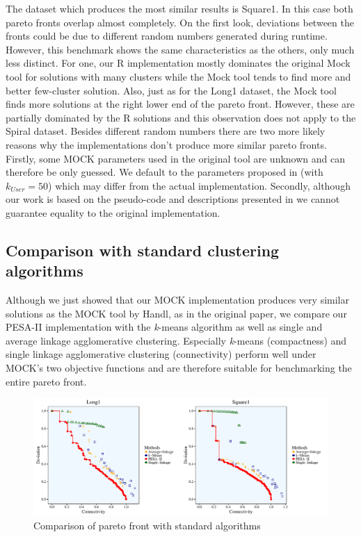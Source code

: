 \documentclass[parskip=half,DIV=14]{scrartcl}\usepackage[]{graphicx}\usepackage[]{color}
\begin{document}
The dataset which produces the most similar results is Square1. In this case both pareto fronts overlap almost completely. On the first look, deviations between the fronts could be due to different random numbers generated during runtime. However, this benchmark shows the same characteristics as the others, only much less distinct. For one, our R implementation mostly dominates the original Mock tool for solutions with many clusters while the Mock tool tends to find more and better few-cluster solution. Also, just as for the Long1 dataset, the Mock tool finds more solutions at the right lower end of the pareto front. However, these are partially dominated by the R solutions and this observation does not apply to the Spiral dataset. Besides different random numbers there are two  more likely reasons why the implementations don’t produce more similar pareto fronts. Firstly, some MOCK parameters used in the original tool are unknown and can therefore be only guessed. We default to the parameters proposed in \cite{handl2007} (with $k_{User}=50$) which may differ from the actual implementation. Secondly, although our work is based on the pseudo-code and descriptions presented in \cite{handl2007} we cannot guarantee equality to the original implementation.

\subsection{Comparison with standard clustering algorithms}

Although we just showed that our MOCK implementation produces very similar solutions as the MOCK tool by Handl, as in the original paper\cite{handl}, we compare our PESA-II implementation with the \textit{k}-means algorithm as well as single and average linkage agglomerative clustering. Especially \textit{k}-means (compactness) and single linkage agglomerative clustering (connectivity) perform well under MOCK’s two objective functions and are therefore suitable for benchmarking the entire pareto front.
\begin{figure}[h]
\begin{center}
\includegraphics[scale=0.65]{figure/Long1Square1Benchmark.pdf}
\caption{Comparison of pareto front with standard algorithms}
\label{fig:standard}
\end{center}
\end{figure}
\end{document}
